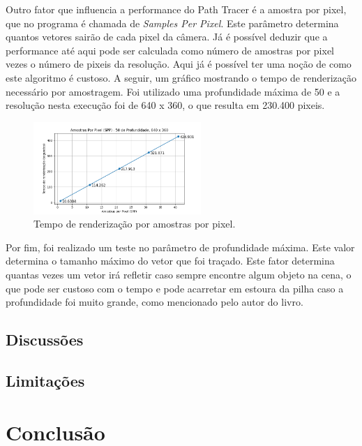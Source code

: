 \documentclass[journal]{IEEEtran}
\begin{document}
Outro fator que influencia a performance do Path Tracer é a amostra por pixel, que no programa é chamada
de \emph{Samples Per Pixel}. Este parâmetro determina quantos vetores sairão de cada pixel da câmera. Já é
possível deduzir que a performance até aqui pode ser calculada como número de amostras por pixel vezes o
número de pixeis da resolução. Aqui já é possível ter uma noção de como este algoritmo é custoso. A seguir,
um gráfico mostrando o tempo de renderização necessário por amostragem. Foi utilizado uma profundidade
máxima de 50 e a resolução nesta execução foi de 640 x 360, o que resulta em 230.400 pixeis.

\begin{figure}[ht]
  \centering
  \includegraphics[width=2.5in]{media/Desktop_SPP.png}
  \caption{Tempo de renderização por amostras por pixel.}
  \label{img_desktop_spp}
\end{figure}

Por fim, foi realizado um teste no parâmetro de profundidade máxima. Este valor determina o tamanho máximo
do vetor que foi traçado. Este fator determina quantas vezes um vetor irá refletir caso sempre encontre algum
objeto na cena, o que pode ser custoso com o tempo e pode acarretar em estoura da pilha caso a profundidade
foi muito grande, como mencionado pelo autor do livro. 
 
\subsection*{Discussões}
\subsection*{Limitações}


\section{Conclusão}




\end{document}
